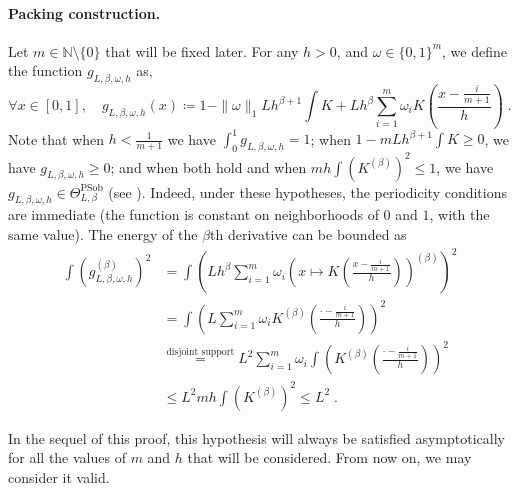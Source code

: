 \documentclass[10pt]{article} %
\newcommand{\N}[0]{\mathbb{N}}
\newcommand\p[1]{\left( {#1}\right)}
\newcommand\RG[1]{\textcolor{red}{#1}}
\newcommand\mRG[1]{\marginpar{\tiny\RG{#1}}}
\begin{document}
\paragraph{Packing construction.}
Let $m \in \N \setminus \{0\}$ that will be fixed later. For any $h > 0$, and $\omega \in \{0, 1\}^m$, we define the function $g_{L, \beta, \omega, h}$ as,
 \begin{equation}
 \label{eq:defgkernel}
     \forall x \in [0, 1],
     \quad 
     g_{L, \beta, \omega, h}(x) \coloneqq 1 - \| \omega \|_1 L h^{\beta+1} \int K + L h^{\beta} \sum_{i=1}^m \omega_i K\p{\frac{x - \frac{i}{m+1}}{h}} \;.
\end{equation}
Note that when $h < \frac{1}{m+1}$ we have $\int_0^1 g_{L,\beta,\omega,h} =1$; when $1 - m L h^{\beta+1} \int K \geq 0$, we have $g_{L,\beta,\omega,h} \geq 0$; and when both hold and when $m h \int \p{K^{(\beta)}}^2 \leq 1$, we have $g_{L, \beta, \omega, h} \in \Theta^{\text{PSob}}_{L, \beta}$ (see ). %
Indeed, under these hypotheses, the periodicity conditions are immediate (the function is constant on neighborhoods of $0$ and $1$, with the same value). The energy of the $\beta$th derivative can be bounded as
\begin{equation*}
\begin{aligned}
    \int \p{g_{L, \beta, \omega, h}^{(\beta)}}^2
    &= \int \p{L h^{\beta} \sum_{i=1}^m \omega_i \p{x \mapsto K\p{ \frac{x - \frac{i}{m+1}}{h}}}^{(\beta)}}^2 \\
    &= \int \p{L\sum_{i=1}^m \omega_i K^{(\beta)}\p{ \frac{\cdot - \frac{i}{m+1}}{h}}}^2 \\
    &\stackrel{\text{disjoint support}}{=} L^2 \sum_{i=1}^m \omega_i\int  \p{K^{(\beta)}\p{ \frac{\cdot - \frac{i}{m+1}}{h}}}^2 \\
    &\leq L^2 m h \int \p{K^{(\beta)}}^2 \leq L^2 \;.
\end{aligned}
\end{equation*}

In the sequel of this proof, this hypothesis will always be satisfied asymptotically for all the values of $m$ and $h$ that will be considered. From now on, we may consider it valid.
\end{document}
